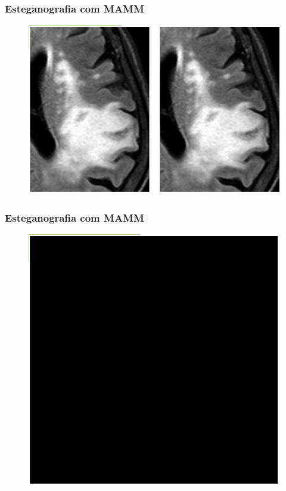 \documentclass{beamer}
\begin{document}
\begin{frame}
\frametitle{Esteganografia com MAMM}
\begin{figure}
\includegraphics[scale=.2]{MAMM.png} 

\end{figure}
\end{frame}

\begin{frame}
\frametitle{Esteganografia com MAMM}
\begin{figure}
\includegraphics[scale=.2]{MAMMdiff.png} 

\end{figure}
\end{frame}
\end{document}
